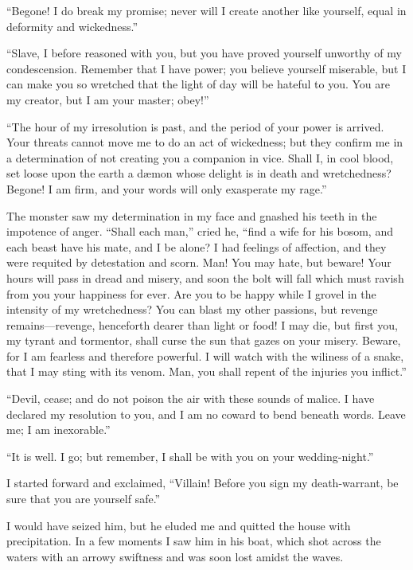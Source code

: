 \documentclass[12pt,openright]{book}
\begin{document}
“Begone! I do break my promise; never will I create another like yourself, equal in deformity and wickedness.”

“Slave, I before reasoned with you, but you have proved yourself unworthy of my condescension. Remember that I have power; you believe yourself miserable, but I can make you so wretched that the light of day will be hateful to you. You are my creator, but I am your master; obey!”

“The hour of my irresolution is past, and the period of your power is arrived. Your threats cannot move me to do an act of wickedness; but they confirm me in a determination of not creating you a companion in vice. Shall I, in cool blood, set loose upon the earth a dæmon whose delight is in death and wretchedness? Begone! I am firm, and your words will only exasperate my rage.”

The monster saw my determination in my face and gnashed his teeth in the impotence of anger. “Shall each man,” cried he, “find a wife for his bosom, and each beast have his mate, and I be alone? I had feelings of affection, and they were requited by detestation and scorn. Man! You may hate, but beware! Your hours will pass in dread and misery, and soon the bolt will fall which must ravish from you your happiness for ever. Are you to be happy while I grovel in the intensity of my wretchedness? You can blast my other passions, but revenge remains—revenge, henceforth dearer than light or food! I may die, but first you, my tyrant and tormentor, shall curse the sun that gazes on your misery. Beware, for I am fearless and therefore powerful. I will watch with the wiliness of a snake, that I may sting with its venom. Man, you shall repent of the injuries you inflict.”

“Devil, cease; and do not poison the air with these sounds of malice. I have declared my resolution to you, and I am no coward to bend beneath words. Leave me; I am inexorable.”

“It is well. I go; but remember, I shall be with you on your wedding-night.”

I started forward and exclaimed, “Villain! Before you sign my death-warrant, be sure that you are yourself safe.”

I would have seized him, but he eluded me and quitted the house with precipitation. In a few moments I saw him in his boat, which shot across the waters with an arrowy swiftness and was soon lost amidst the waves.
\end{document}
